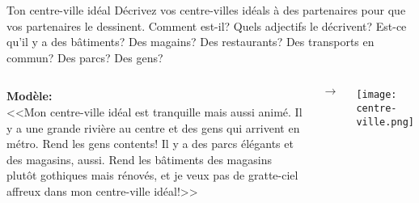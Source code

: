 \begin{frame}{Ton centre-ville idéal}
  \small
  Décrivez vos centre-villes idéals à des partenaires pour que vos partenaires le dessinent.
  Comment est-il?
  Quels adjectifs le décrivent?
  Est-ce qu'il y a des bâtiments?
  Des magains?
  Des restaurants?
  Des transports en commun?
  Des parcs?
  Des gens?
  \vspace{0.15cm}
  \begin{columns}
    \footnotesize
      \textbf{Modèle:} \\
      <<Mon centre-ville idéal est tranquille mais aussi animé. Il y a une grande rivière au centre et des gens qui arrivent en métro. \alert{Rend} les gens contents! Il y a des parcs élégants et des magasins, aussi. \alert{Rend} les bâtiments des magasins plutôt gothiques mais rénovés, et je veux pas de gratte-ciel affreux dans mon centre-ville idéal!>>
      \begin{center}
        $\to$
      \end{center}
      \begin{center}
        \texttt{[image: centre-ville.png]} \\
        \vspace{0.75cm}
      \end{center}
  \end{columns}
\end{frame}